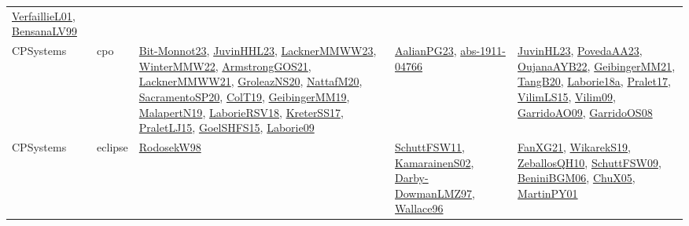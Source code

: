 {\begin{longtable}{llp{6cm}p{6cm}p{6cm}}
\href{papers/VerfaillieL01.pdf}{VerfaillieL01}\cite{VerfaillieL01}, \href{articles/BensanaLV99.pdf}{BensanaLV99}\cite{BensanaLV99}\\
CPSystems & cpo & \href{papers/Bit-Monnot23.pdf}{Bit-Monnot23}\cite{Bit-Monnot23}, \href{papers/JuvinHHL23.pdf}{JuvinHHL23}\cite{JuvinHHL23}, \href{articles/LacknerMMWW23.pdf}{LacknerMMWW23}\cite{LacknerMMWW23}, \href{papers/WinterMMW22.pdf}{WinterMMW22}\cite{WinterMMW22}, \href{papers/ArmstrongGOS21.pdf}{ArmstrongGOS21}\cite{ArmstrongGOS21}, \href{papers/LacknerMMWW21.pdf}{LacknerMMWW21}\cite{LacknerMMWW21}, \href{papers/GroleazNS20.pdf}{GroleazNS20}\cite{GroleazNS20}, \href{papers/NattafM20.pdf}{NattafM20}\cite{NattafM20}, \href{articles/SacramentoSP20.pdf}{SacramentoSP20}\cite{SacramentoSP20}, \href{papers/ColT19.pdf}{ColT19}\cite{ColT19}, \href{papers/GeibingerMM19.pdf}{GeibingerMM19}\cite{GeibingerMM19}, \href{papers/MalapertN19.pdf}{MalapertN19}\cite{MalapertN19}, \href{articles/LaborieRSV18.pdf}{LaborieRSV18}\cite{LaborieRSV18}, \href{articles/KreterSS17.pdf}{KreterSS17}\cite{KreterSS17}, \href{papers/PraletLJ15.pdf}{PraletLJ15}\cite{PraletLJ15}, \href{articles/GoelSHFS15.pdf}{GoelSHFS15}\cite{GoelSHFS15}, \href{papers/Laborie09.pdf}{Laborie09}\cite{Laborie09} & \href{papers/AalianPG23.pdf}{AalianPG23}\cite{AalianPG23}, \href{articles/abs-1911-04766.pdf}{abs-1911-04766}\cite{abs-1911-04766} & \href{papers/JuvinHL23.pdf}{JuvinHL23}\cite{JuvinHL23}, \href{papers/PovedaAA23.pdf}{PovedaAA23}\cite{PovedaAA23}, \href{papers/OujanaAYB22.pdf}{OujanaAYB22}\cite{OujanaAYB22}, \href{papers/GeibingerMM21.pdf}{GeibingerMM21}\cite{GeibingerMM21}, \href{papers/TangB20.pdf}{TangB20}\cite{TangB20}, \href{papers/Laborie18a.pdf}{Laborie18a}\cite{Laborie18a}, \href{papers/Pralet17.pdf}{Pralet17}\cite{Pralet17}, \href{papers/VilimLS15.pdf}{VilimLS15}\cite{VilimLS15}, \href{papers/Vilim09.pdf}{Vilim09}\cite{Vilim09}, \href{articles/GarridoAO09.pdf}{GarridoAO09}\cite{GarridoAO09}, \href{articles/GarridoOS08.pdf}{GarridoOS08}\cite{GarridoOS08}\\
CPSystems & eclipse & \href{papers/RodosekW98.pdf}{RodosekW98}\cite{RodosekW98} & \href{articles/SchuttFSW11.pdf}{SchuttFSW11}\cite{SchuttFSW11}, \href{papers/KamarainenS02.pdf}{KamarainenS02}\cite{KamarainenS02}, \href{articles/Darby-DowmanLMZ97.pdf}{Darby-DowmanLMZ97}\cite{Darby-DowmanLMZ97}, \href{articles/Wallace96.pdf}{Wallace96}\cite{Wallace96} & \href{articles/FanXG21.pdf}{FanXG21}\cite{FanXG21}, \href{articles/WikarekS19.pdf}{WikarekS19}\cite{WikarekS19}, \href{articles/ZeballosQH10.pdf}{ZeballosQH10}\cite{ZeballosQH10}, \href{papers/SchuttFSW09.pdf}{SchuttFSW09}\cite{SchuttFSW09}, \href{papers/BeniniBGM06.pdf}{BeniniBGM06}\cite{BeniniBGM06}, \href{papers/ChuX05.pdf}{ChuX05}\cite{ChuX05}, \href{articles/MartinPY01.pdf}{MartinPY01}\cite{MartinPY01}\\

\end{longtable}}
